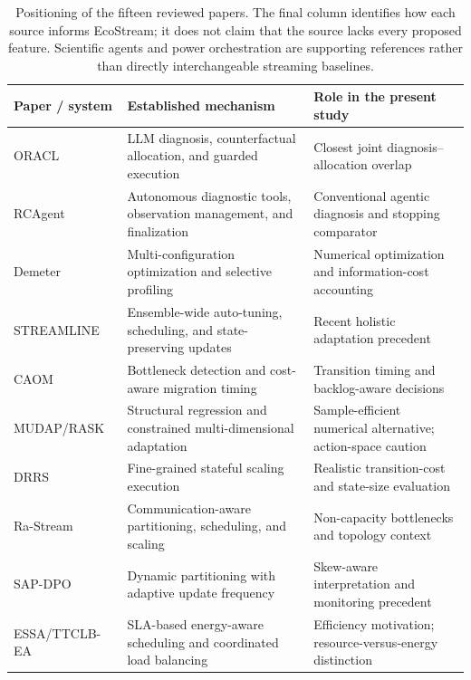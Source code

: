\begin{table}[t]
\caption{Positioning of the fifteen reviewed papers. The final column identifies how each source informs EcoStream; it does not claim that the source lacks every proposed feature. Scientific agents and power orchestration are supporting references rather than directly interchangeable streaming baselines.}
\label{tab:related-work}
\centering
\footnotesize
\setlength{\tabcolsep}{5pt}
\renewcommand{\arraystretch}{1.13}
\begin{tabularx}{\textwidth}{@{}p{} >{\raggedright\arraybackslash}X >{\raggedright\arraybackslash}X@{}}
\toprule
\textbf{Paper / system} & \textbf{Established mechanism} & \textbf{Role in the present study} \\
\midrule
ORACL~\cite{bai2026oracl} & LLM diagnosis, counterfactual allocation, and guarded execution & Closest joint diagnosis--allocation overlap \\
RCAgent~\cite{wang2024rcagent} & Autonomous diagnostic tools, observation management, and finalization & Conventional agentic diagnosis and stopping comparator \\
Demeter~\cite{geldenhuys2024demeter} & Multi-configuration optimization and selective profiling & Numerical optimization and information-cost accounting \\
STREAMLINE~\cite{pedratscher2025streamline} & Ensemble-wide auto-tuning, scheduling, and state-preserving updates & Recent holistic adaptation precedent \\
CAOM~\cite{tan2025caom} & Bottleneck detection and cost-aware migration timing & Transition timing and backlog-aware decisions \\
MUDAP/RASK~\cite{sedlak2026mudap} & Structural regression and constrained multi-dimensional adaptation & Sample-efficient numerical alternative; action-space caution \\
DRRS~\cite{qing2025drrs} & Fine-grained stateful scaling execution & Realistic transition-cost and state-size evaluation \\
Ra-Stream~\cite{fan2026rastream} & Communication-aware partitioning, scheduling, and scaling & Non-capacity bottlenecks and topology context \\
SAP-DPO~\cite{ren2026sapdpo} & Dynamic partitioning with adaptive update frequency & Skew-aware interpretation and monitoring precedent \\
ESSA/TTCLB-EA~\cite{li2025energyflink} & SLA-based energy-aware scheduling and coordinated load balancing & Efficiency motivation; resource-versus-energy distinction \\

\end{tabularx}
\end{table}
